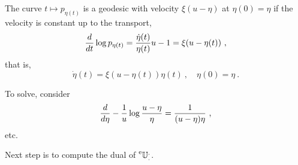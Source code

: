\documentclass[12pt,a4paper]{amsart}
\begin{document}
The curve $t \mapsto p_{\eta(t)}$ is a geodesic with velocity $\xi (u - \eta)$ at $\eta(0) = \eta$ if the velocity is constant up to the transport,
\begin{equation}
  \label{eq:15}
  \frac{d}{dt} \log p_{\eta(t)} = \frac {\dot\eta(t)} {\eta(t)} u - 1 = \xi (u - \eta(t)) \ ,  
\end{equation}
that is,
\begin{equation}
  \label{eq:16}
  \dot \eta(t) = \xi (u - \eta(t))\eta(t) \ , \quad \eta(0) = \eta \ .
\end{equation}

To solve, consider
\begin{equation}
  \label{eq:17}
  \frac{d}{d\eta} - \frac 1 u \log \frac {u - \eta} \eta = \frac 1 {(u - \eta) \eta} \ ,
\end{equation}
etc.

Next step is to compute the dual of $\prescript{\text{e}}{} {\mathbb U} _ {.} ^ {.}$.
% 


\end{document}
